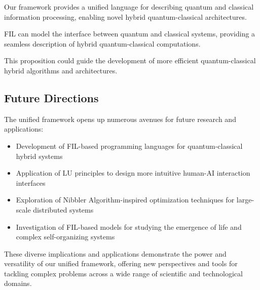 Our framework provides a unified language for describing quantum and classical information processing, enabling novel hybrid quantum-classical architectures.

\begin{proposition}
FIL can model the interface between quantum and classical systems, providing a seamless description of hybrid quantum-classical computations.
\end{proposition}

This proposition could guide the development of more efficient quantum-classical hybrid algorithms and architectures.

\subsection{Future Directions}

The unified framework opens up numerous avenues for future research and applications:

\begin{itemize}
    \item Development of FIL-based programming languages for quantum-classical hybrid systems
    \item Application of LU principles to design more intuitive human-AI interaction interfaces
    \item Exploration of Nibbler Algorithm-inspired optimization techniques for large-scale distributed systems
    \item Investigation of FIL-based models for studying the emergence of life and complex self-organizing systems
\end{itemize}

These diverse implications and applications demonstrate the power and versatility of our unified framework, offering new perspectives and tools for tackling complex problems across a wide range of scientific and technological domains.